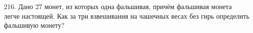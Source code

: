216. Дано 27 монет, из которых одна фальшивая, причём фальшивая монета легче настоящей. Как за три взвешивания на чашечных весах без гирь определить фальшивую монету?\\
